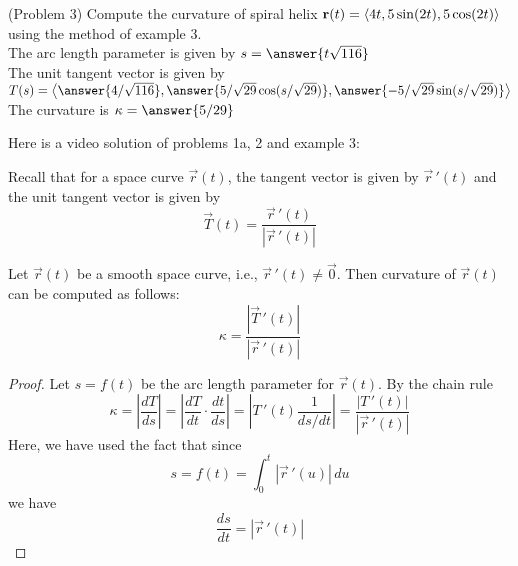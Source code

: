 \documentclass[handout]{ximera}
\begin{document}
\begin{problem}(Problem 3)
Compute the curvature of spiral helix $\mathbf r(t) = \left\langle 4t, 5 \sin(2t),5\cos(2t)\right\rangle$ using the method of example 3.\\
The arc length parameter is given by $s = \answer{t\sqrt{116}}$\\
The unit tangent vector is given by $T(s) = \vector{\answer{4/\sqrt{116}}, \answer{5/\sqrt{29} \cos(s/\sqrt{29})}, \answer{-5/\sqrt{29} \sin(s/\sqrt{29})}}$\\
The curvature is $\kappa = \answer{5/29}$
\end{problem}
Here is a video solution of problems 1a, 2 and example 3:\\
\begin{foldable}
\end{foldable}

Recall that for a space curve $\vec r(t)$, the tangent vector is given by $\vec r\,'(t)$ and the unit tangent vector is given by
\[
\vec T(t) = \frac{\vec r\,'(t)}{|\vec r\,'(t)|}
\]



\begin{proposition}
Let $\vec r(t)$ be a smooth space curve, i.e., $\vec r\,'(t) \neq \vec 0$. Then curvature of $\vec r(t)$ can be computed as follows:
\[
\kappa = \frac{|\vec T\,'(t)|}{|\vec r\,'(t)|}
\]
\end{proposition}
\begin{proof}
Let $s = f(t)$ be the arc length parameter for $\vec r(t)$. By the chain rule
\[
\kappa = \left|\frac{dT}{ds}\right| = \left|\frac{dT}{dt} \cdot \frac{dt}{ds}\right| = \left|T\,'(t) \frac{1}{ds/dt}\right| = \frac{|T\,'(t)|}{|\vec r\,'(t)|}
\]
Here, we have used the fact that since
\[
s = f(t) = \int_0^t |\vec r\,'(u)| \, du
\]
we have
\[
\frac{ds}{dt} = |\vec r\,'(t)|
\]
\end{proof}
\end{document}
